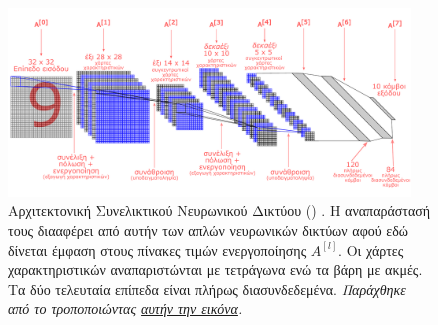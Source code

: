 \begin{figure}[h]
  \centering
  \includegraphics[width=0.95\textwidth]{images/chapter theoritical background/LeNet_good_greek.pdf}
  \caption{Αρχιτεκτονική Συνελικτικού Νευρωνικού Δικτύου () \cite{lenet}. Η αναπαράστασή τους διααφέρει από αυτήν των απλών νευρωνικών δικτύων αφού εδώ δίνεται έμφαση στους πίνακες τιμών ενεργοποίησης $A^{[l]}$. Οι χάρτες χαρακτηριστικών αναπαριστώνται με τετράγωνα ενώ τα βάρη με ακμές. Τα δύο τελευταία επίπεδα είναι πλήρως διασυνδεδεμένα. \textit{Παράχθηκε από το \href{https://inkscape.org/}{} τροποποιώντας \href{https://pabloinsente.github.io/the-convolutional-network}{αυτήν την εικόνα}.}}
  \label{fig:_nn_lenet}
\end{figure}

